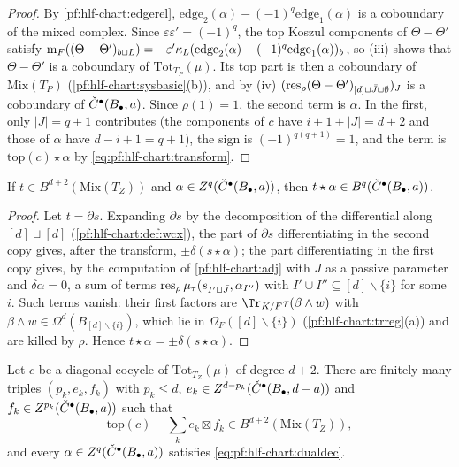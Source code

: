 \begin{proof}
By \cref{pf:hlf-chart:edgerel}, $\mathrm{edge}_2(\alpha)-(-1)^q\mathrm{edge}_1(\alpha)$ is a coboundary of the mixed complex. Since
$\varepsilon\varepsilon'=(-1)^q$, the top Koszul components of $\Theta-\Theta'$ satisfy
$\operatorname{m}_F((\Theta-\Theta')_{b\sqcup L})=-\varepsilon'\kappa_L(\mathrm{edge}_2(\alpha)-(-1)^q\mathrm{edge}_1(\alpha))_b$, so (iii) shows that
$\Theta-\Theta'$ is a coboundary of $\mathrm{Tot}_{T_P}(\mu)$. Its top part is then a coboundary of $\mathrm{Mix}(T_P)$ (\cref{pf:hlf-chart:sysbasic}(b)),
and by (iv) $(\operatorname{res}_\rho(\Theta-\Theta')_{[d]\sqcup\bar J\sqcup\emptyset})_J$ is a coboundary of $\check{C}^\bullet(B_\bullet,a)$. Since $\rho(1)=1$, the
second term is $\alpha$. In the first, only $|J|=q+1$ contributes (the components of $c$ have $i+1+|J|=d+2$ and those of $\alpha$ have $d-i+1=q+1$),
the sign is $(-1)^{q(q+1)}=1$, and the term is $\mathrm{top}(c)\star\alpha$ by \eqref{eq:pf:hlf-chart:transform}.
\end{proof}

\begin{lemma}\label{pf:hlf-chart:rcuptop}
If $t\in B^{d+2}(\mathrm{Mix}(T_Z))$ and $\alpha\in Z^q(\check{C}^\bullet(B_\bullet,a))$, then $t\star\alpha\in B^q(\check{C}^\bullet(B_\bullet,a))$.
\end{lemma}

\begin{proof}
Let $t=\partial s$. Expanding $\partial s$ by the decomposition of the differential along $[d]\sqcup\bar{[d]}$ (\cref{pf:hlf-chart:def:wcx}), the
part of $\partial s$ differentiating in the second copy gives, after the transform, $\pm\delta(s\star\alpha)$; the part differentiating in the first
copy gives, by the computation of \cref{pf:hlf-chart:adj} with $J$ as a passive parameter and $\delta\alpha=0$, a sum of terms
$\operatorname{res}_\rho\mu_\tau(s_{I'\sqcup\bar J},\alpha_{I''})$ with $I'\cup I''\subseteq[d]\smallsetminus\{i\}$ for some $i$. Such terms vanish: their first
factors are $\Tr_{K/F}\tau(\beta\wedge w)$ with $\beta\wedge w\in\Omega^d(B_{[d]\smallsetminus\{i\}})$, which lie in $\Omega_F([d]\smallsetminus\{i\})$
(\cref{pf:hlf-chart:trreg}(a)) and are killed by $\rho$. Hence $t\star\alpha=\pm\delta(s\star\alpha)$.
\end{proof}

\begin{lemma}\label{pf:hlf-chart:zid}
Let $c$ be a diagonal cocycle of $\mathrm{Tot}_{T_Z}(\mu)$ of degree $d+2$. There are finitely many triples $(p_k,e_k,f_k)$ with $p_k\le d$,
$e_k\in Z^{d-p_k}(\check{C}^\bullet(B_\bullet,d-a))$ and $f_k\in Z^{p_k}(\check{C}^\bullet(B_\bullet,a))$ such that
\begin{equation}\label{eq:pf:hlf-chart:topdec}
  \mathrm{top}(c)-\sum_ke_k\boxtimes f_k\in B^{d+2}(\mathrm{Mix}(T_Z)),
\end{equation}
and every $\alpha\in Z^q(\check{C}^\bullet(B_\bullet,a))$ satisfies \eqref{eq:pf:hlf-chart:dualdec}.
\end{lemma}

